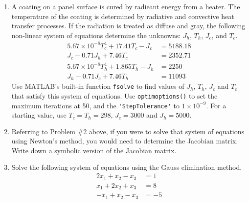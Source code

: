 \begin{fullwidth}
\begin{enumerate}
\end{enumerate}
\vspace{1.0cm}



\begin{enumerate}[resume]
\item A coating on a panel surface is cured by radieant energy from a heater. The temperature of the coating is determined by radiative and convective heat transfer processes.  If the radiation is treated as diffuse and gray, the following non-linear system of equations determine the unknowns: $J_h$, $T_h$, $J_c$, and $T_c$.
\begin{align*}
5.67 \times 10^{-8} T^4_{c} + 17.41 T_c - J_c &= 5188.18 \\
J_c - 0.71 J_h + 7.46 T_c &= 2352.71 \\
5.67 \times 10^{-8} T^4_{h} + 1.865 T_h - J_h &= 2250 \\
J_h - 0.71 J_c + 7.46 T_h &= 11093
\end{align*}
Use MATLAB's built-in function \lstinline[style=myMatlab]{fsolve} to find values of $J_h$, $T_h$, $J_c$ and $T_c$ that satisfy this system of equations.  Use \lstinline[style=myMatlab]{optimoptions()} to set the maximum iterations at 50, and the \lstinline[style=myMatlab]{'StepTolerance'} to $1 \times 10^{-9}$.  For a starting value, use $T_c = T_h = 298$, $J_c = 3000$ and $J_h = 5000$.


\vspace{2.0cm}

\item Referring to Problem \#2 above, if you were to solve that system of equations using Newton's method, you would need to determine the Jacobian matrix.  Write down a symbolic version of the Jacobian matrix.

\vspace{2.0cm}

\item Solve the following system of equations using the Gauss elimination method.
\begin{align*}
2x_1 + x_2 - x_3 &= 1\\
x_1 + 2x_2 + x_3 &= 8\\
-x_1 + x_2 - x_3 &= -5\\
\end{align*}

\end{enumerate}


\vspace{2.0cm}


\end{fullwidth}
